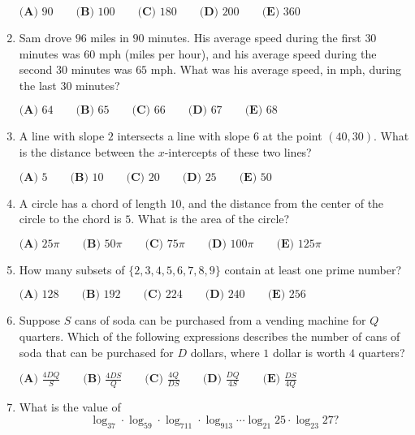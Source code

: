 \documentclass{article}
\begin{document}
\begin{enumerate}[label=\arabic*., itemsep=0.5em]
\(\textbf{(A) } 90 \qquad \textbf{(B) } 100 \qquad \textbf{(C) } 180 \qquad \textbf{(D) } 200 \qquad \textbf{(E) } 360\)\par \vspace{0.5em}\item Sam drove \(96\) miles in \(90\) minutes. His average speed during the first \(30\) minutes was \(60\) mph (miles per hour), and his average speed during the second \(30\) minutes was \(65\) mph. What was his average speed, in mph, during the last \(30\) minutes?

\(
\textbf{(A) } 64 \qquad
\textbf{(B) } 65 \qquad
\textbf{(C) } 66 \qquad
\textbf{(D) } 67 \qquad
\textbf{(E) } 68
\)\par \vspace{0.5em}\item A line with slope \(2\) intersects a line with slope \(6\) at the point \((40,30)\). What is the distance between the \(x\)-intercepts of these two lines? 

\(\textbf{(A) } 5 \qquad \textbf{(B) } 10 \qquad \textbf{(C) } 20 \qquad \textbf{(D) } 25 \qquad \textbf{(E) } 50\)\par \vspace{0.5em}\item A circle has a chord of length \(10\), and the distance from the center of the circle to the chord is \(5\). What is the area of the circle?

\(
\textbf{(A) }25\pi \qquad
\textbf{(B) }50\pi \qquad
\textbf{(C) }75\pi \qquad
\textbf{(D) }100\pi \qquad
\textbf{(E) }125\pi \qquad
\)\par \vspace{0.5em}\item How many subsets of \(\{2,3,4,5,6,7,8,9\}\) contain at least one prime number?

\(
\textbf{(A) } 128 \qquad
\textbf{(B) } 192 \qquad
\textbf{(C) } 224 \qquad
\textbf{(D) } 240 \qquad
\textbf{(E) } 256
\)\par \vspace{0.5em}\item Suppose \(S\) cans of soda can be purchased from a vending machine for \(Q\) quarters. Which of the following expressions describes the number of cans of soda that can be purchased for \(D\) dollars, where \(1\) dollar is worth \(4\) quarters?

\(\textbf{(A) } \frac{4DQ}{S} \qquad \textbf{(B) } \frac{4DS}{Q} \qquad \textbf{(C) } \frac{4Q}{DS} \qquad \textbf{(D) } \frac{DQ}{4S} \qquad \textbf{(E) } \frac{DS}{4Q}\)\par \vspace{0.5em}\item What is the value of 
\begin{equation*}
\log_37\cdot\log_59\cdot\log_711\cdot\log_913\cdots\log_{21}25\cdot\log_{23}27?
\end{equation*}


\end{enumerate}
\end{document}

